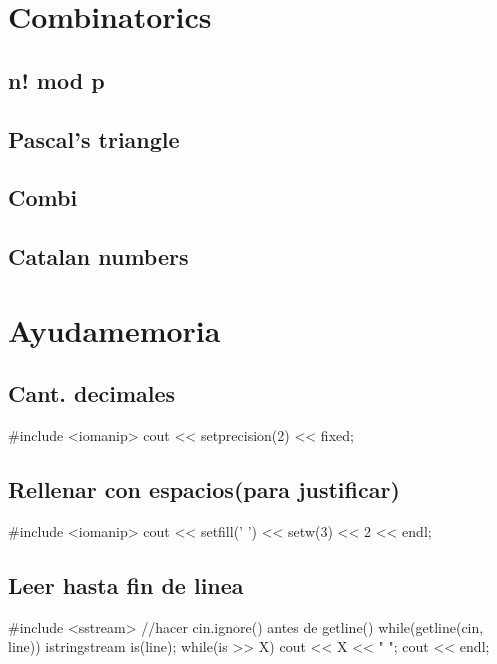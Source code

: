 \section{Combinatorics}
\subsection{n! mod p}
\subsection{Pascal's triangle}
\subsection{Combi}
\subsection{Catalan numbers}



\section{Ayudamemoria}%
\subsection*{Cant. decimales}
\begin{code}
#include <iomanip>
cout << setprecision(2) << fixed;
\end{code}
\subsection*{Rellenar con espacios(para justificar)}
\begin{code}
#include <iomanip>
cout << setfill(' ') << setw(3) << 2 << endl;
\end{code}
\subsection*{Leer hasta fin de linea}
\begin{code}
#include <sstream>
//hacer cin.ignore() antes de getline()
while(getline(cin, line)){
   	 istringstream is(line);
   	 while(is >> X)
   		 cout << X << " ";
   	 cout << endl;
}
\end{code}
